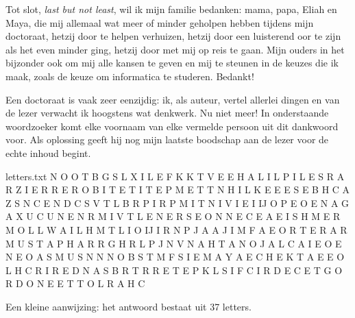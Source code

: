 \documentclass[main]{subfiles}
\begin{document}
Tot slot, \textit{last but not least}, wil ik mijn familie bedanken: mama, papa, Eliah en Maya, die mij allemaal wat meer of minder geholpen hebben tijdens mijn doctoraat, hetzij door te helpen verhuizen, hetzij door een luisterend oor te zijn als het even minder ging, hetzij door met mij op reis te gaan.
Mijn ouders in het bijzonder ook om mij alle kansen te geven en mij te steunen in de keuzes die ik maak, zoals de keuze om informatica te studeren.
Bedankt!

\pagebreak

Een doctoraat is vaak zeer eenzijdig: ik, als auteur, vertel allerlei dingen en van de lezer verwacht ik hoogstens wat denkwerk.
Nu niet meer!
In onderstaande woordzoeker komt elke voornaam van elke vermelde persoon uit dit dankwoord voor.
Als oplossing geeft hij nog mijn laatste boodschap aan de lezer voor de echte inhoud begint.

\begin{filecontents*}{letters.txt}
N O O T B G S L X I L E F K K T V
E E H A L I L P I L E S R A R Z I
E R R E R O B I T E T I T E P M E
T T N H I L K E E E S E B H C A Z
S N C E N D C S V T L B R P I R P
M I T N I V I E I IJ O P E O E N A
G A X U C U N E N R M I V T L E N
E R S E O N N E C E A E I S H M E
R M O L L W A I L H M T L I O IJ I
R N P J A A J I M F A E O R T E R
A R M U S T A P H A R R G H R L P
J N V N A H T A N O J A L C A I E
O E N E O A S M U S N N N O B S T
M F S I E M A Y A E C H E K T A E
E O L H C R I R E D N A S B R T R
R E T E P K L S I F C I R D E C E
T G O R D O N E E T T O L R A H C
\end{filecontents*}

\readarray*{}

\vspace{\fill}

\begin{wide}
\end{wide}

{\small Een kleine aanwijzing: het antwoord bestaat uit 37 letters.}



\end{document}
